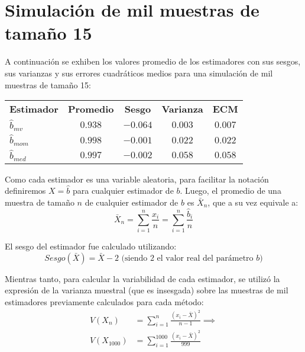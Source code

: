 \section{Simulación de mil muestras de tamaño 15}
A continuación se exhiben los valores promedio de los estimadores con sus sesgos, sus varianzas y sus errores cuadráticos medios para una simulación de mil muestras de tamaño 15:

\begin{table}[H]
	\centering
	\begin{tabular}{lcccc}
		\textbf{Estimador} 	& \textbf{Promedio}	& \textbf{Sesgo}	& \textbf{Varianza} & \textbf{ECM}	\\
		$\hat{b}_{mv}$		& $0.938$			& $-0.064$			& $0.003$			& $0.007$		\\
		$\hat{b}_{mom}$		& $0.998$			& $-0.001$			& $0.022$			& $0.022$		\\
		$\hat{b}_{med}$		& $0.997$			& $-0.002$			& $0.058$			& $0.058$
	\end{tabular}
\end{table}

Como cada estimador es una variable aleatoria, para facilitar la notación definiremos $X = \hat{b}$ para cualquier estimador de $b$. Luego, el promedio de una muestra de tamaño $n$ de cualquier estimador de $b$ es $\bar{X}_{n}$, que a su vez equivale a:
$$\bar{X}_{n} = \sum_{i=1}^{n}\frac{x_{i}}{n} = \sum_{i=1}^{n}\frac{\hat{b}_{i}}{n}$$

El sesgo del estimador fue calculado utilizando:
$$Sesgo(\bar{X}) = \bar{X} - 2 \text{ (siendo } 2 \text{ el valor real del parámetro } b \text{)}$$

Mientras tanto, para calcular la variabilidad de cada estimador, se utilizó la expresión de la varianza muestral (que es insesgada) sobre las muestras de mil estimadores previamente calculados para cada método:
\begin{align*}
	V(X_{n}) &= \sum_{i=1}^{n}\frac{(x_{i}-\bar{X})^2}{n - 1} \implies \\
	V(X_{1000}) &= \sum_{i=1}^{1000}\frac{(x_{i}-\bar{X})^2}{999}
\end{align*}